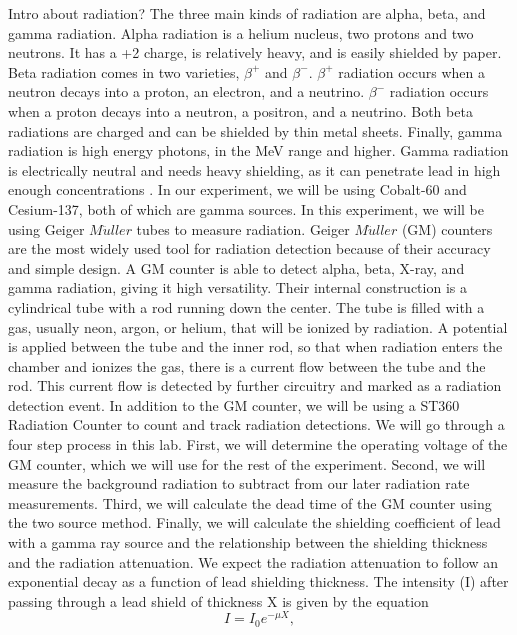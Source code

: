 	Intro about radiation?
	The three main kinds of radiation are alpha, beta, and gamma radiation. Alpha radiation is a helium nucleus, two protons and two neutrons. It has a +2 charge, is relatively heavy, and is easily shielded by paper. Beta radiation comes in two varieties, $\beta^+$ and $\beta^-$. $\beta^+$ radiation occurs when a neutron decays into a proton, an electron, and a neutrino. $\beta^-$ radiation occurs when a proton decays into a neutron, a positron, and a neutrino. Both beta radiations are charged and can be shielded by thin metal sheets. Finally, gamma radiation is high energy photons, in the MeV range and higher. Gamma radiation is electrically neutral and needs heavy shielding, as it can penetrate lead in high enough concentrations \cite{Radiation Source}. In our experiment, we will be using Cobalt-60 and Cesium-137, both of which are gamma sources.
	In this experiment, we will be using Geiger $M\ddot{u}ller$ tubes to measure radiation. Geiger $M\ddot{u}ller$ (GM) counters are the most widely used tool for radiation detection because of their accuracy and simple design. A GM counter is able to detect alpha, beta, X-ray, and gamma radiation, giving it high versatility. Their internal construction is a cylindrical tube with a rod running down the center. The tube is filled with a gas, usually neon, argon, or helium, that will be ionized by radiation. A potential is applied between the tube and the inner rod, so that when radiation enters the chamber and ionizes the gas, there is a current flow between the tube and the rod. This current flow is detected by further circuitry and marked as a radiation detection event.\cite{Centric} In addition to the GM counter, we will be using a ST360 Radiation Counter to count and track radiation detections.
	We will go through a four step process in this lab. First, we will determine the operating voltage of the GM counter, which we will use for the rest of the experiment. Second, we will measure the background radiation to subtract from our later radiation rate measurements. Third, we will calculate the dead time of the GM counter using the two source method. Finally, we will calculate the shielding coefficient of lead with a gamma ray source and the relationship between the shielding thickness and the radiation attenuation. 
	We expect the radiation attenuation to follow an exponential decay as a function of lead shielding thickness. The intensity (I) after passing through a lead shield of thickness X is given by the equation 
\begin{equation}
I = I_0e^{-\mu X},
\end{equation}
